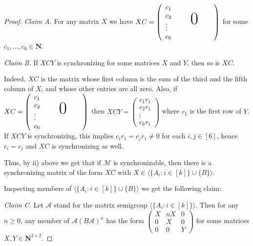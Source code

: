 \documentclass[submission,copyright,creativecommons]{eptcs}
\def\bN{{\mathbf{N}}}
\theoremstyle{plain}
\theoremstyle{definition}
\theoremstyle{remark}
\begin{document}
\begin{proof}
{\sl Claim A.} For any matrix $X$ we have $XC=\left(\begin{array}{l}c_1\\c_2\\\vdots\\c_6\end{array}{\textrm{\Huge{\quad$0$\quad}}}\right)$ for some $c_1,\ldots,c_6\in \bN$.

{\sl Claim B.} If $XCY$ is synchronizing for some matrices $X$ and $Y$, then so is $XC$.

Indeed, $XC$ is the matrix whose first column is the sum of the third and the fifth column of $X$, and whose other entries are all zero.
Also, if $XC=\left(\begin{array}{l}c_1\\c_2\\\vdots\\c_6\end{array}{\textrm{\Huge{\quad$0$\quad}}}\right)$ then
$XCY=\left(\begin{array}{l}c_1r_1\\c_2r_1\\\vdots\\c_6r_1\end{array}\right)$ where $r_1$ is the first row of $Y$.
If $XCY$ is synchronizing, this implies $c_ir_1=c_jr_1\neq 0$ for each $i,j\in[6]$, hence $c_i=c_j$ and $XC$ is synchronizing as well.

Thus, by ii) above we get that if $\mathcal{M}$ is synchronizable, then there is a synchronizing matrix of the form $XC$ with $X\in\langle \{A_i:i\in[k]\}\cup\{B\}\rangle$.

Inspecting members of $\langle\{A_i:i\in[k]\}\cup\{B\}\rangle$ we get the following claim:

{\sl Claim C.} Let $\mathcal{A}$ stand for the matrix semigroup $\langle\{A_i:i\in[k]\}\rangle$. Then for any $n\geq 0$, any member of
$\mathcal{A}(B\mathcal{A})^n$ has the form $\left(\begin{array}{lll}X&nX&0\\0&X&0\\0&0&Y\end{array}\right)$ for some
matrices $X,Y\in\bN^{2\times 2}$.


\end{proof}
\end{document}
